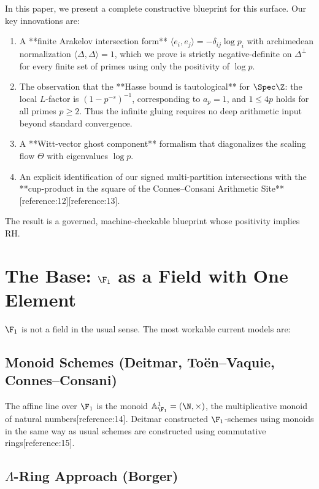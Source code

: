 \documentclass[11pt,a4paper]{article}
\begin{document}
In this paper, we present a complete constructive blueprint for this surface. Our key innovations are:

\begin{enumerate}
\item A **finite Arakelov intersection form** $\langle e_i, e_j \rangle = -\delta_{ij}\log p_i$ with archimedean normalization $\langle \Delta, \Delta \rangle = 1$, which we prove is strictly negative-definite on $\Delta^\perp$ for every finite set of primes using only the positivity of $\log p$.
\item The observation that the **Hasse bound is tautological** for $\Spec \Z$: the local $L$-factor is $(1-p^{-s})^{-1}$, corresponding to $a_p=1$, and $1 \le 4p$ holds for all primes $p \ge 2$. Thus the infinite gluing requires no deep arithmetic input beyond standard convergence.
\item A **Witt-vector ghost component** formalism that diagonalizes the scaling flow $\Theta$ with eigenvalues $\log p$.
\item An explicit identification of our signed multi-partition intersections with the **cup-product in the square of the Connes--Consani Arithmetic Site**[reference:12][reference:13].
\end{enumerate}

The result is a governed, machine-checkable blueprint whose positivity implies RH.

\section{The Base: $\F_1$ as a Field with One Element}

$\F_1$ is not a field in the usual sense. The most workable current models are:

\subsection{Monoid Schemes (Deitmar, To\"en--Vaquie, Connes--Consani)}

The affine line over $\F_1$ is the monoid $\mathbb{A}^1_{\F_1} = (\N, \times)$, the multiplicative monoid of natural numbers[reference:14]. Deitmar constructed $\F_1$-schemes using monoids in the same way as usual schemes are constructed using commutative rings[reference:15].

\subsection{$\Lambda$-Ring Approach (Borger)}
\end{document}
